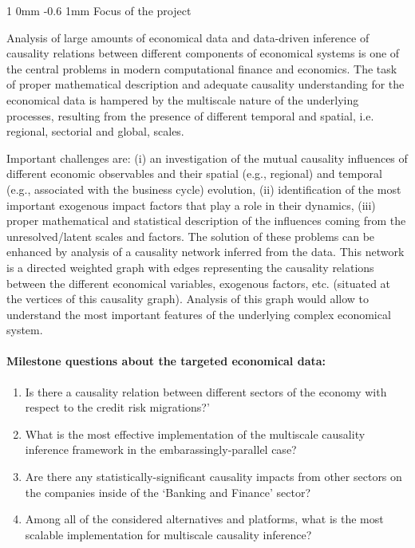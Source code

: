 \documentclass[a0,portrait]{a0poster}
\makeatletter
\renewcommand{\section}{\@startsection
        {section}%
        {1}%
        {0mm}%
        {-0.6\baselineskip}%
        {1mm}%
        {\Large\color{NTNUBlue}\bfseries}}%
\makeatother
\begin{document}
\begin{multicols}{2}


\section{Focus of the project}
\label{causality}

{\large Analysis of large amounts of economical data and data-driven inference of causality relations between different
 components of economical systems  is one of the central problems in modern computational finance and economics. The task of proper mathematical description and adequate causality understanding for the economical data is hampered by the multiscale nature of the underlying processes, resulting from the presence of different temporal and spatial, i.e. regional, sectorial and global, scales. }

\noindent
{\large Important challenges are: (i) an investigation of the mutual causality influences of different economic observables and their spatial (e.g., regional) and temporal (e.g., associated with the business cycle) evolution, (ii) identification of the most important exogenous impact factors that play a role in their dynamics, (iii) proper mathematical and statistical description of the influences coming from the unresolved/latent scales and factors. The solution of these problems can be enhanced by  analysis of  a causality network inferred from the data.  This network is a directed weighted graph with edges representing the causality relations between the  different economical variables, exogenous factors, etc. (situated at the vertices of this causality graph). Analysis of this graph would allow to understand the most important features of the underlying complex economical system.
}

\paragraph{\large Milestone questions about the targeted economical data:}

{\large 
{\color{NTNUBlue}
\begin{enumerate}
  \item {Is there a causality relation between different sectors of the economy with respect to the credit risk migrations?'}
  \item {What is the most effective implementation of the multiscale causality inference framework in the embarassingly-parallel case?}
  \item {Are there any statistically-significant causality impacts from other sectors on the companies inside of the `Banking and Finance' sector?}
  \item {Among all of the considered alternatives and platforms, what is the most scalable implementation for multiscale causality inference?}
\end{enumerate}
}
}



\end{multicols}
\end{document}
